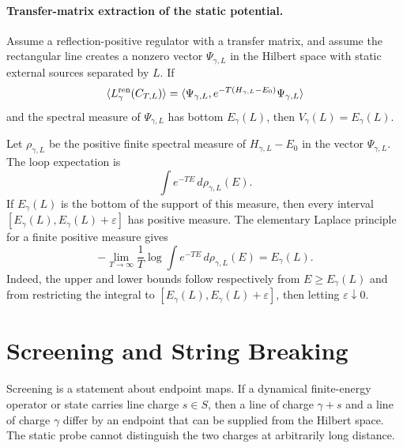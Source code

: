\paragraph{Transfer-matrix extraction of the static potential.}
Assume a reflection-positive regulator with a transfer matrix, and assume
the rectangular line creates a nonzero vector \(\Psi_{\gamma,L}\) in the
Hilbert space with static external sources separated by \(L\).  If
\[
  \langle L_\gamma^{\rm ren}(C_{T,L})\rangle
  =
  \langle \Psi_{\gamma,L},
  e^{-T(H_{\gamma,L}-E_0)}\Psi_{\gamma,L}\rangle
\]
and the spectral measure of \(\Psi_{\gamma,L}\) has bottom
\(E_\gamma(L)\), then \(V_\gamma(L)=E_\gamma(L)\).

Let \(\rho_{\gamma,L}\) be the positive finite spectral measure of
\(H_{\gamma,L}-E_0\) in the vector \(\Psi_{\gamma,L}\).  The loop expectation
is
\[
  \int e^{-TE}\,d\rho_{\gamma,L}(E).
\]
If \(E_\gamma(L)\) is the bottom of the support of this measure, then every
interval \([E_\gamma(L),E_\gamma(L)+\varepsilon]\) has positive measure.
The elementary Laplace principle for a finite positive measure gives
\[
  -\lim_{T\to\infty}\frac{1}{T}
  \log\int e^{-TE}\,d\rho_{\gamma,L}(E)
  =
  E_\gamma(L).
\]
Indeed, the upper and lower bounds follow respectively from
\(E\ge E_\gamma(L)\) and from restricting the integral to
\([E_\gamma(L),E_\gamma(L)+\varepsilon]\), then letting
\(\varepsilon\downarrow0\).

\section{Screening and String Breaking}

Screening is a statement about endpoint maps.  If a dynamical finite-energy
operator or state carries line charge \(s\in S\), then a line of charge
\(\gamma+s\) and a line of charge \(\gamma\) differ by an endpoint that can
be supplied from the Hilbert space.  The static probe cannot distinguish the
two charges at arbitrarily long distance.

